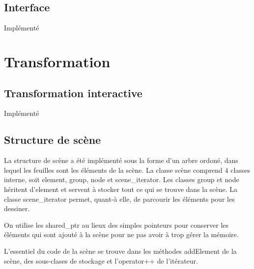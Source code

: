 \subsection{Interface}
Implémenté

\section{Transformation}
\subsection{Transformation interactive}
Implémenté

\subsection{Structure de scène}
La structure de scène a été implémenté sous la forme d'un arbre ordoné, dans lequel les feuilles sont les éléments de la scène. La classe scène comprend 4 classes interne, soit element, group, node et scene\_iterator. Les classes group et node héritent d'element et  servent à stocker tout ce qui se trouve dans la scène. La classe scene\_iterator permet, quant-à elle, de parcourir les éléments pour les dessiner. 

On utilise les shared\_ptr au lieux des simples pointeurs pour conserver les éléments qui sont ajouté à la scène pour ne pas avoir à trop gérer la mémoire.

L'essentiel du code de la scène se trouve dans les méthodes addElement de la scène, des sous-clases de stockage et l'operator++ de l'itérateur.

